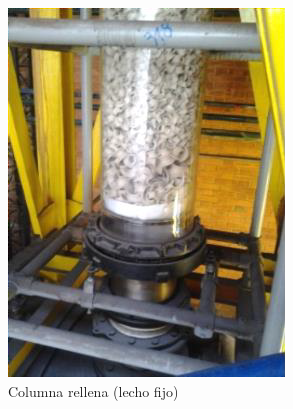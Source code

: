 \begin{multicols}{3}
    \begin{figure}
        \centering
        \includegraphics[width=\textwidth]{img/fotos/reactor_columna_rellena.png}
        \caption{Columna rellena (lecho fijo)}
        \label{fig:reactor_columna_rellena}
    \end{figure}
    

\end{multicols}

